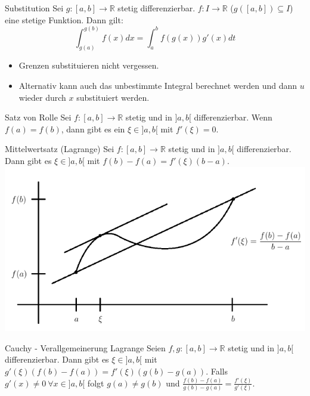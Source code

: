 \documentclass[a4paper,10pt]{article}
\def\R{\mathbb{R}}
\begin{document}
\begin{mainbox}{Substitution}
  Sei $g: [a, b] \to \mathbb{R}$ stetig differenzierbar. $f: I \to \mathbb{R}$ ($g([a, b]) \subseteq I$) eine stetige Funktion. Dann gilt:
  $$\int_{g(a)}^{g(b)} f(x)dx = \int_{a}^{b} f(g(x))g'(x)dt$$
\end{mainbox}

\begin{itemize}
 \item Grenzen substituieren nicht vergessen.
 \item Alternativ kann auch das unbestimmte Integral berechnet werden und dann $u$ wieder durch $x$ substituiert werden.
\end{itemize}

\begin{subbox}{Satz von Rolle}
  Sei $f: [a,b] \to \R$ stetig und in $]a,b[$ differenzierbar. Wenn $f(a) = f(b)$, dann gibt es ein $\xi \in ]a,b[$ mit $f'(\xi) = 0$.
 \end{subbox}

\begin{mainbox}{Mittelwertsatz (Lagrange)}
  Sei $f: [a,b] \to \R$ stetig und in $]a,b[$ differenzierbar. Dann gibt es $\xi \in ]a,b[$ mit $f(b) - f(a) = f'(\xi)(b-a)$.
  \includegraphics[width=\linewidth]{mittelwertsatz.png}
 \end{mainbox}
 
 \begin{subbox}{Cauchy - Verallgemeinerung Lagrange}
   Seien $f, g: [a, b] \to \mathbb{R}$ stetig und in $]a, b[$ differenzierbar. Dann gibt es $\xi \in ]a, b[$ mit $g'(\xi)(f(b) - f(a)) = f'(\xi)(g(b) - g(a))$. Falls $g'(x) \neq 0 \ \forall x \in ]a, b[$ folgt $g(a) \neq g(b)$ und $\frac{f(b)-f(a)}{g(b)-g(a)} = \frac{f'(\xi)}{g'(\xi)}$.
 \end{subbox}
\end{document}
